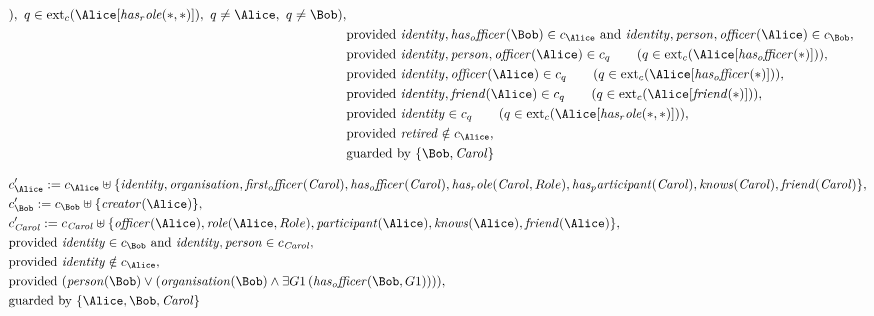 \begin{align*}
[
\mathit{
friend
}
(
\ast
)
]
)
,\ 
q
 \in 
\mathrm{ext}_c(
\Alice
[
\mathit{
has_role
}
(
\ast
,
\ast
)
]
)
,\ 
q \neq 
\Alice
,\ 
q \neq 
\Bob
)
,\\
&
\text{provided } 
\mathit{
identity
}
,
\mathit{
has_officer
}
(
\Bob
)
 \in c_
{
\Alice
}
 \text{ and } 
\mathit{
identity
}
,
\mathit{
person
}
,
\mathit{
officer
}
(
\Alice
)
 \in c_
{
\Bob
}
,\\
&
\text{provided } 
\mathit{
identity
}
,
\mathit{
person
}
,
\mathit{
officer
}
(
\Alice
)
 \in c_
q
 \qquad (
q \in 
\mathrm{ext}_c(
\Alice
[
\mathit{
has_officer
}
(
\ast
)
]
)
)
,\\
&
\text{provided } 
\mathit{
identity
}
,
\mathit{
officer
}
(
\Alice
)
 \in c_
q
 \qquad (
q \in 
\mathrm{ext}_c(
\Alice
[
\mathit{
has_officer
}
(
\ast
)
]
)
)
,\\
&
\text{provided } 
\mathit{
identity
}
,
\mathit{
friend
}
(
\Alice
)
 \in c_
q
 \qquad (
q \in 
\mathrm{ext}_c(
\Alice
[
\mathit{
friend
}
(
\ast
)
]
)
)
,\\
&
\text{provided } 
\mathit{
identity
}
 \in c_
q
 \qquad (
q \in 
\mathrm{ext}_c(
\Alice
[
\mathit{
has_role
}
(
\ast
,
\ast
)
]
)
)
,\\
&
\text{provided } 
\mathit{
retired
}
 \notin c_
{
\Alice
}
,\\
&
\text{guarded by } \{
\Bob
,
\mathit{Carol}
\}
\end{align*}

\begin{align*}
&
c'_
{
\Alice
}
 := 
c_
{
\Alice
}
 \uplus 
\{
\mathit{
identity
}
,
\mathit{
organisation
}
,
\mathit{
first_officer
}
(
\mathit{Carol}
)
,
\mathit{
has_officer
}
(
\mathit{Carol}
)
,
\mathit{
has_role
}
(
\mathit{Carol}
,
Role
)
,
\mathit{
has_participant
}
(
\mathit{Carol}
)
,
\mathit{
knows
}
(
\mathit{Carol}
)
,
\mathit{
friend
}
(
\mathit{Carol}
)
\}
,\\
&
c'_
{
\Bob
}
 := 
c_
{
\Bob
}
 \uplus 
\{
\mathit{
creator
}
(
\Alice
)
\}
,\\
&
c'_
{
\mathit{Carol}
}
 := 
c_
{
\mathit{Carol}
}
 \uplus 
\{
\mathit{
officer
}
(
\Alice
)
,
\mathit{
role
}
(
\Alice
,
Role
)
,
\mathit{
participant
}
(
\Alice
)
,
\mathit{
knows
}
(
\Alice
)
,
\mathit{
friend
}
(
\Alice
)
\}
,\\
&
\text{provided } 
\mathit{
identity
}
 \in c_
{
\Bob
}
 \text{ and } 
\mathit{
identity
}
,
\mathit{
person
}
 \in c_
{
\mathit{Carol}
}
,\\
&
\text{provided } 
\mathit{
identity
}
 \notin c_
{
\Alice
}
,\\
&
\text{provided } 
(
\mathit{
person
}
(
\Bob
)
\lor
(
\mathit{
organisation
}
(
\Bob
)
\land
\exists 
G1
\,(
\mathit{
has_officer
}
(
\Bob
,
G1
)
)
)
)
,\\
&
\text{guarded by } \{
\Alice
,
\Bob
,
\mathit{Carol}
\}
\end{align*}
